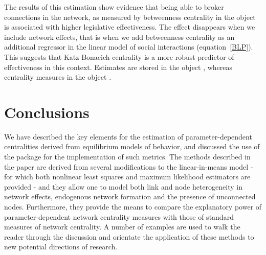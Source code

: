 \documentclass[nojss]{jss}
\begin{document}
	The results of this estimation show evidence that being able to broker connections in the network, as measured by betweenness centrality in the object 
	is associated with higher legislative effectiveness. The effect disappears when we include network effects, that is when we add betweenness centrality as an additional regressor in the linear model of social interactions (equation~\ref{BLP}). This suggests that Katz-Bonacich centrality is a more robust predictor of effectiveness in this context. Estimates are stored in the object , whereas centrality measures in the object .
	
	\section{Conclusions}
	
	We have described the key elements for the estimation of parameter-dependent centralities derived from equilibrium models of behavior, and discussed the use of the package  for the implementation of such metrics. The methods described in the paper are derived from several modifications to the linear-in-means model - for which both nonlinear least squares
	and maximum likelihood estimators are provided - and they allow one to model both link and node heterogeneity in network effects, endogenous network formation and the presence of unconnected nodes. Furthermore, they provide the means to compare the explanatory power of parameter-dependent network centrality measures with those of standard measures of network
	centrality. A number of examples are used to walk the reader through the discussion and orientate the application of these methods to new potential directions of research.
	

\end{document}
